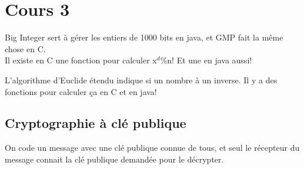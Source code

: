 \section{Cours 3}
Big Integer sert à gérer les entiers de 1000 bits en java, et GMP fait la même chose en C.\\
Il existe en C une fonction pour calculer x$^d$\%n! Et une en java aussi!

L'algorithme d'Euclide étendu indique si un nombre à un inverse. Il y a des fonctions pour calculer ça en C et en java!

\subsection{Cryptographie à clé publique}
On code un message avec une clé publique connue de tous, et seul le récepteur du message connait la clé publique
demandée pour le décrypter.
